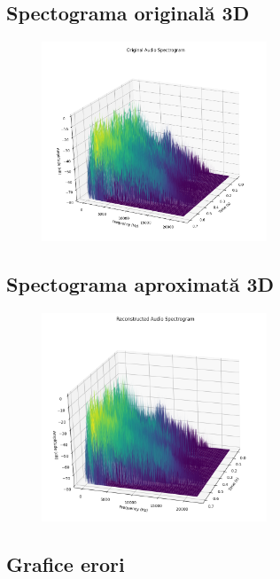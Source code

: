 \documentclass[12pt]{article}
\begin{document}
\subsection{Spectograma originală 3D}

\begin{figure}[h!]
    \centering
    \includegraphics[width=0.6\textwidth]{3dog.png}
\end{figure}

\subsection{Spectograma aproximată 3D}

\begin{figure}[h!]
    \centering
    \includegraphics[width=0.6\textwidth]{3dap.png}
\end{figure}

\subsection{Grafice erori}
\end{document}
